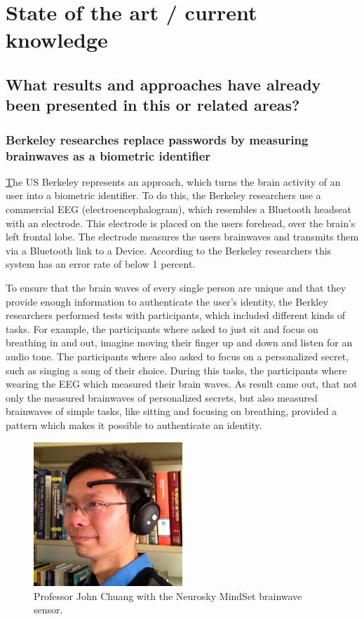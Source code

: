 \section{State of the art / current knowledge}
\label{sect:star}
\subsection{What results and approaches have already been presented in this or related areas?}
\subsubsection{Berkeley researches replace passwords by measuring brainwaves as a biometric identifier}
\href{http://people.ischool.berkeley.edu/~chuang/pubs/usec13.pdf}
The US Berkeley represents an approach, which turns the brain activity of an user into a biometric identifier. To do this, the Berkeley researchers use a commercial EEG (electroencephalogram), which resembles a Bluetooth headseat with an electrode. This electrode is placed on the users forehead, over the brain's left frontal lobe. The electrode measures the users brainwaves and transmits them via a Bluetooth link to a Device. According to the Berkeley researchers this system has an error rate of below 1 percent.

To ensure that the brain waves of every single person are unique and that they provide enough information to authenticate the user's identity, the Berkley researchers performed tests with participants, which included different kinds of tasks. For example, the participants where asked to just sit and focus on breathing in and out, imagine moving their finger up and down and listen for an audio tone. The participants where also asked to focus on a personalized secret, such as singing a song of their choice. During this tasks, the participants where wearing the EEG which measured their brain waves. As result came out, that not only the measured brainwaves of personalized secrets, but also measured brainwaves of simple tasks, like sitting and focusing on breathing, provided a pattern which makes it possible to authenticate an identity.
\begin{figure}[H]
	\centering
    \includegraphics[width=0.5\textwidth]{john_chuang}
    \caption{Professor John Chuang with the Neurosky MindSet brainwave sensor.}
\end{figure}
